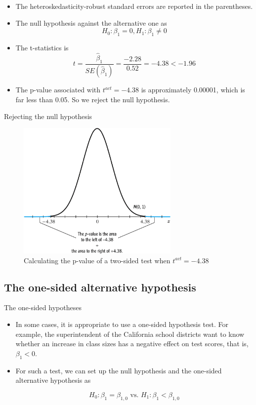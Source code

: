 \documentclass[presentation]{beamer}
\begin{document}
\begin{itemize}
\item The \alert{heteroskedasticity-robust} standard errors are reported in the
parentheses.

\item The null hypothesis against the alternative one as
\[ H_0: \beta_1 = 0, H_1: \beta_1 \neq 0 \]

\item The t-statistics is
\[ t = \frac{\hat{\beta}_1}{SE(\hat{\beta}_1)} = \frac{-2.28}{0.52}
  = -4.38 < -1.96 \]

\item The p-value associated with \(t^{act} = -4.38\) is approximately
0.00001, which is far less than 0.05. So we reject the null
hypothesis.
\end{itemize}

\begin{frame}[label={sec:org3717675}]{Rejecting the null hypothesis}
\begin{figure}[htbp]
\centering
\includegraphics[width=0.7\textwidth]{figure/fig-5-1.png}
\caption{\label{fig:orgc5a34c7}
Calculating the p-value of a two-sided test when \(t^{act}=-4.38\)}
\end{figure}
\end{frame}

\subsection*{The one-sided alternative hypothesis}
\label{sec:orga1798dd}

\begin{frame}[label={sec:org6f22138}]{The one-sided hypotheses}
\begin{itemize}
\item In some cases, it is appropriate to use a one-sided hypothesis
test. For example, the superintendent of the California school
districts want to know whether an increase in class sizes has a
negative effect on test scores, that is, \(\beta_1 < 0\).

\item For such a test, we can set up the null hypothesis and the one-sided
alternative hypothesis as

\[ H_0: \beta_1 = \beta_{1,0} \text{ vs. } H_1: \beta_1 < \beta_{1,0} \]
\end{itemize}
\end{frame}
\end{document}
